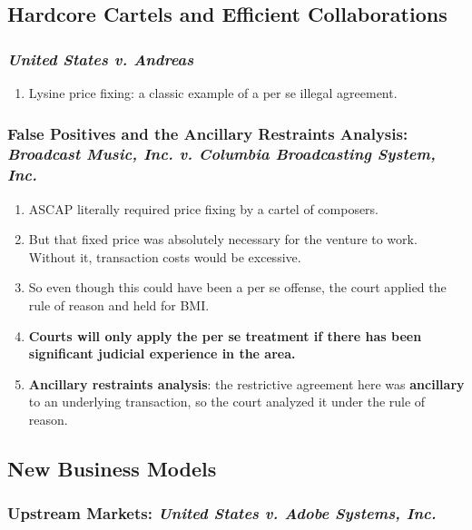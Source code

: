 \subsection{Hardcore Cartels and Efficient Collaborations}

\subsubsection{\emph{United States v. Andreas}}

\begin{enumerate}
    \item Lysine price fixing: a classic example of a per se illegal agreement.
\end{enumerate}

\subsubsection{False Positives and the Ancillary Restraints Analysis: 
\emph{Broadcast Music, Inc. v. Columbia Broadcasting System, Inc.}}

\begin{enumerate}
    \item ASCAP literally required price fixing by a cartel of composers.
    \item But that fixed price was absolutely necessary for the venture to work.  
    Without it, transaction costs would be excessive.
    \item So even though this could have been a per se offense, the court 
    applied the rule of reason and held for BMI.
    \item \textbf{Courts will only apply the per se treatment if there has been 
    significant judicial experience in the area.}
    \item \textbf{Ancillary restraints analysis}: the restrictive agreement here 
    was \textbf{ancillary} to an underlying transaction, so the court analyzed 
    it under the rule of reason.
\end{enumerate}

\subsection{New Business Models}

\subsubsection{Upstream Markets: \emph{United States v. Adobe Systems, Inc.}}

